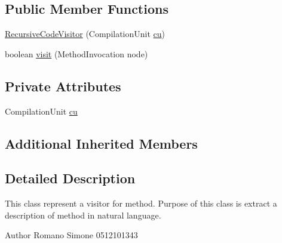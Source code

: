 \subsection*{Public Member Functions}
\begin{DoxyCompactItemize}
\item 
\hyperlink{classit_1_1isislab_1_1masonassisteddocumentation_1_1visitor_1_1_recursive_code_visitor_afd11873750082bdda52dbd69e9c86764}{Recursive\-Code\-Visitor} (Compilation\-Unit \hyperlink{classit_1_1isislab_1_1masonassisteddocumentation_1_1visitor_1_1_recursive_code_visitor_a1adf4bdd3390549bd3e631365b5033c3}{cu})
\item 
boolean \hyperlink{classit_1_1isislab_1_1masonassisteddocumentation_1_1visitor_1_1_recursive_code_visitor_ae3a05eadf37fa7680eeb661ed7ca1b8c}{visit} (Method\-Invocation node)
\end{DoxyCompactItemize}
\subsection*{Private Attributes}
\begin{DoxyCompactItemize}
\item 
Compilation\-Unit \hyperlink{classit_1_1isislab_1_1masonassisteddocumentation_1_1visitor_1_1_recursive_code_visitor_a1adf4bdd3390549bd3e631365b5033c3}{cu}
\end{DoxyCompactItemize}
\subsection*{Additional Inherited Members}


\subsection{Detailed Description}
This class represent a visitor for method. Purpose of this class is extract a description of method in natural language. \begin{DoxyAuthor}{Author}
Romano Simone 0512101343 
\end{DoxyAuthor}


